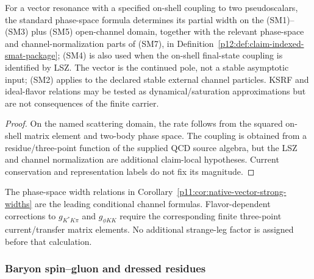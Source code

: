 \documentclass[12pt,a4paper]{article}
\begin{document}
\begin{corollary}
\label{p11:cor:native-vector-strong-widths}

For a vector resonance with a specified on-shell coupling to two pseudoscalars,
the standard phase-space formula determines its partial width on the
\textnormal{(SM1)--(SM3)} plus \textnormal{(SM5)} open-channel domain, together
with the relevant phase-space and channel-normalization parts of
\textnormal{(SM7)}, in
Definition~\ref{p12:def:claim-indexed-smat-package}; \textnormal{(SM4)} is also
used when the on-shell final-state coupling is identified by LSZ.  The vector
is the continued pole, not a stable asymptotic input; \textnormal{(SM2)} applies
to the declared stable external channel particles.  KSRF and ideal-flavor
relations may be tested as dynamical/saturation approximations but are not
consequences of the finite carrier.
\label{p11:eq:native-g-rho-pi-pi}
\label{p11:eq:native-vector-widths-numeric}
\end{corollary}
\begin{proof}

On the named scattering domain, the rate follows from the squared on-shell
matrix element and two-body phase space.  The coupling is obtained from a
residue/three-point function of the supplied QCD source algebra, but the LSZ and
channel normalization are additional claim-local hypotheses.  Current
conservation and representation labels do not fix its magnitude.
\end{proof}

\begin{remark}
\label{p11:rem:vector-vertex-reclosure-targets}
The phase-space width relations in
Corollary~\ref{p11:cor:native-vector-strong-widths} are the leading conditional
channel formulas.  Flavor-dependent corrections to \(g_{K^*K\pi}\) and
\(g_{\phi KK}\) require the corresponding finite three-point current/transfer
matrix elements.  No additional strange-leg factor is assigned before that
calculation.
\end{remark}


\subsubsection[Native baryon spin--gluon and dressed-residue closure blocks]
{Baryon spin--gluon and dressed residues}
\label{p11:subsec:native-baryon-dressed-closures}
\end{document}
